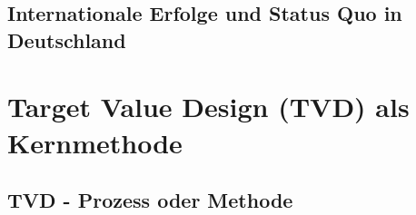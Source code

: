 \subsection{Internationale Erfolge und Status Quo in Deutschland}
\label{sec:2.2.3}


\clearpage

\section{Target Value Design (TVD) als Kernmethode}
\label{sec: 2.3}


\subsection{TVD - Prozess oder Methode}
\label{sec: 2.3.1}

%
%
%
%
%
%

